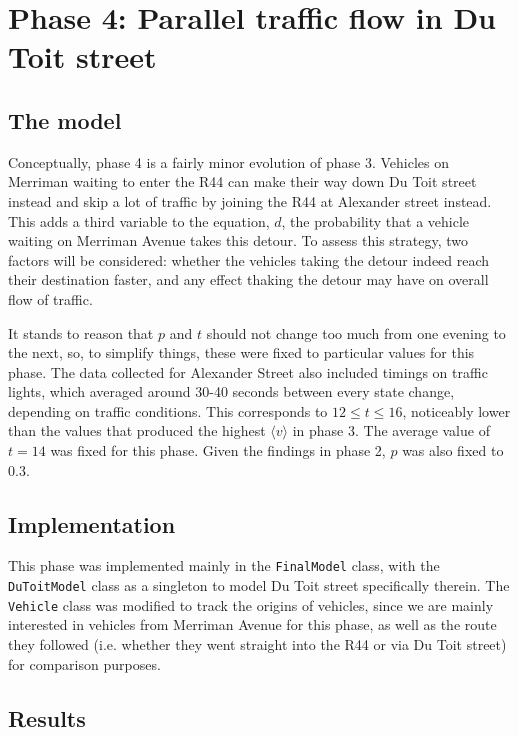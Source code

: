 \documentclass{article}
\begin{document}
\section*{Phase 4: Parallel traffic flow in Du Toit street}

\subsection*{The model}

Conceptually, phase 4 is a fairly minor evolution of phase 3. Vehicles on Merriman waiting to enter the R44 can make their way down Du Toit street instead and skip a lot of traffic by joining the R44 at Alexander street instead. This adds a third variable to the equation, $d$, the probability that a vehicle waiting on Merriman Avenue takes this detour. To assess this strategy, two factors will be considered: whether the vehicles taking the detour indeed reach their destination faster, and any effect thaking the detour may have on overall flow of traffic.

It stands to reason that $p$ and $t$ should not change too much from one evening to the next, so, to simplify things, these were fixed to particular values for this phase. The data collected for Alexander Street also included timings on traffic lights, which averaged around 30-40 seconds between every state change, depending on traffic conditions. This corresponds to $12 \leq t \leq 16$, noticeably lower than the values that produced the highest $\langle v \rangle$ in phase 3. The average value of $t=14$ was fixed for this phase. Given the findings in phase 2, $p$ was also fixed to 0.3.

\subsection*{Implementation}

This phase was implemented mainly in the \texttt{FinalModel} class, with the \texttt{DuToitModel} class as a singleton to model Du Toit street specifically therein. The \texttt{Vehicle} class was modified to track the origins of vehicles, since we are mainly interested in vehicles from Merriman Avenue for this phase, as well as the route they followed (i.e. whether they went straight into the R44 or via Du Toit street) for comparison purposes.

\subsection*{Results}
\end{document}
